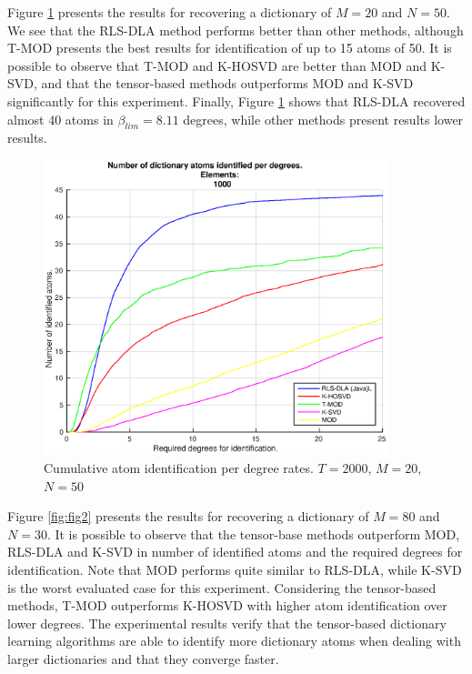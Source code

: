 Figure \ref{fig:fig1} presents the results for recovering a dictionary of $M=20$ and $N=50$. We see that the RLS-DLA method performs better than other methods, although T-MOD presents the best results for identification of up to 15 atoms of 50. It is possible to observe that T-MOD and K-HOSVD are better than MOD and K-SVD, and that the tensor-based methods outperforms MOD and K-SVD significantly for this experiment. Finally, Figure \ref{fig:fig1} shows that RLS-DLA recovered almost 40 atoms in $\beta_{lim} = 8.11$ degrees, while other methods present results lower results.

\begin{figure}[!htb]
	\centering 
	\includegraphics[width=10cm]{figures/5_20_2000_1000_100.eps}
	\caption{Cumulative atom identification per degree rates. $T=2000$, $M=20$, $N=50$}
	\label{fig:fig1}
\end{figure}

Figure \ref{fig:fig2} presents the results for recovering a dictionary of $M=80$ and $N=30$. It is possible to observe that the tensor-base methods outperform MOD, RLS-DLA and K-SVD in number of identified atoms and the required degrees for identification. Note that MOD performs quite similar to RLS-DLA, while K-SVD is the worst evaluated case for this experiment. Considering the tensor-based methods, T-MOD outperforms K-HOSVD with higher atom identification over lower degrees. The experimental results verify that the tensor-based dictionary learning algorithms are able to identify more dictionary atoms when dealing with larger dictionaries and that they converge faster.

